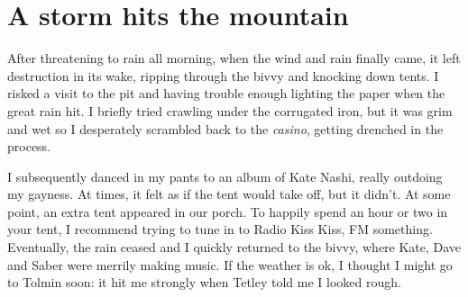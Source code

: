 \begin{marginfigure}
\end{marginfigure}

\section{A storm hits the mountain}

After threatening to rain all morning, when the wind and rain finally came, it left destruction in its wake, ripping through the bivvy and knocking down tents. I risked a visit to the pit and having trouble enough lighting the paper when the great rain hit. I briefly tried crawling under the corrugated iron, but it was grim and wet so I desperately scrambled back to the \emph{casino}, getting drenched in the process. 

I subsequently danced in my pants to an album of Kate Nashi, really outdoing my gayness. At times, it felt as if the tent would take off, but it didn't. At some point, an extra tent appeared in our porch. To happily spend an hour or two in your tent, I recommend trying to tune in to Radio Kiss Kiss, FM something. Eventually, the rain ceased and I quickly returned to the bivvy, where Kate, Dave and Saber were merrily making music. If the weather is ok, I thought I might go to Tolmin soon: it hit me strongly when Tetley told me I looked rough.



